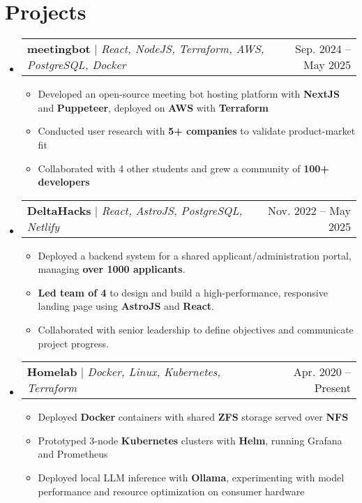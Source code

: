 \documentclass[letterpaper,11pt]{article}
\makeatletter
\newcommand{\resumeItem}[1]{
  \item\small{
    {#1 \vspace{-2pt}}
  }
}
\newcommand{\resumeProjectHeading}[2]{
    \item
    \begin{tabular*}{0.97\textwidth}{l@{\extracolsep{\fill}}r}
      \small#1 & #2 \\
    \end{tabular*}\vspace{-7pt}
}
\newcommand{\resumeSubHeadingListStart}{\begin{itemize}[leftmargin=0.15in, label={}]}
\newcommand{\resumeSubHeadingListEnd}{\end{itemize}}
\newcommand{\resumeItemListStart}{\begin{itemize}}
\newcommand{\resumeItemListEnd}{\end{itemize}\vspace{-5pt}}
\makeatother
\begin{document}
\section{Projects}
    \resumeSubHeadingListStart
        \resumeProjectHeading
            {\textbf{meetingbot} $|$ \emph{React, NodeJS, Terraform, AWS, PostgreSQL, Docker}}{Sep. 2024 -- May 2025}
        \resumeItemListStart
            \resumeItem{Developed an open-source meeting bot hosting platform with \textbf{NextJS} and \textbf{Puppeteer}, deployed on \textbf{AWS} with \textbf{Terraform}}
            \resumeItem{Conducted user research with \textbf{5+ companies} to validate product-market fit}
            \resumeItem{Collaborated with 4 other students and grew a community of \textbf{100+ developers}}
        \resumeItemListEnd

        \resumeProjectHeading
            {\textbf{DeltaHacks} $|$ \emph{React, AstroJS, PostgreSQL, Netlify}}{Nov. 2022 -- May 2025}
        \resumeItemListStart
            \resumeItem{Deployed a backend system for a shared applicant/administration portal, managing \textbf{over 1000 applicants}.}
            \resumeItem{\textbf{Led team of 4} to design and build a high-performance, responsive landing page using \textbf{AstroJS} and \textbf{React}.}
            \resumeItem{Collaborated with senior leadership to define objectives and communicate project progress.}
        \resumeItemListEnd
        
        \resumeProjectHeading
            {\textbf{Homelab} $|$ \emph{Docker, Linux, Kubernetes, Terraform}} {Apr. 2020 -- Present}
        \resumeItemListStart
            \resumeItem{Deployed \textbf{Docker} containers with shared \textbf{ZFS} storage served over \textbf{NFS}}
            \resumeItem{Prototyped 3-node \textbf{Kubernetes} clusters with \textbf{Helm}, running Grafana and Prometheus}
            \resumeItem{Deployed local LLM inference with \textbf{Ollama}, experimenting with model performance and resource optimization on consumer hardware}
        \resumeItemListEnd
    \resumeSubHeadingListEnd


\end{document}

